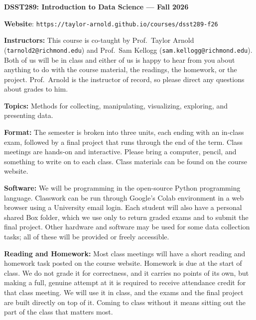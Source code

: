 \documentclass[11pt, a4paper]{article}
\begin{document}
\begin{center}
\textbf{DSST289: Introduction to Data Science --- Fall 2026}
\end{center}

\vspace{0.5cm}

\textbf{Website}: \texttt{https://taylor-arnold.github.io/courses/dsst289-f26}

\bigskip

\textbf{Instructors:}
This course is co-taught by Prof.~Taylor Arnold (\texttt{tarnold2@richmond.edu}) and Prof.~Sam Kellogg (\texttt{sam.kellogg@richmond.edu}). Both of us will be in class and either of us is happy to hear from you about anything to do with the course material, the readings, the homework, or the project. Prof.~Arnold is the instructor of record, so please direct any questions about grades to him.

\bigskip

\textbf{Topics:}
Methods for collecting, manipulating, visualizing, exploring, and presenting
data.

\bigskip

\textbf{Format:}
The semester is broken into three units, each ending with an in-class exam, followed by a final project that runs through the end of the term. Class meetings are hands-on and interactive. Please bring a computer, pencil, and something to write on to each class. Class materials can be found on the course website.

\bigskip

\textbf{Software:}
We will be programming in the open-source Python programming language. Classwork can be run through Google's Colab environment in a web browser using a University email login. Each student will also have a personal shared Box folder, which we use only to return graded exams and to submit the final project. Other hardware and software may be used for some data collection tasks; all of these will be provided or freely accessible.

\bigskip

\textbf{Reading and Homework:}
Most class meetings will have a short reading and homework task posted on the course website. Homework is due at the start of class. We do not grade it for correctness, and it carries no points of its own, but making a full, genuine attempt at it is required to receive attendance credit for that class meeting. We will use it in class, and the exams and the final project are built directly on top of it. Coming to class without it means sitting out the part of the class that matters most.
\end{document}
